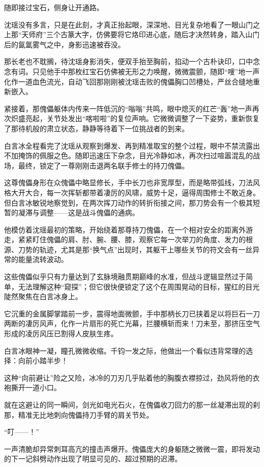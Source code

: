 随即接过宝石，侧身让开通路。

沈瑶没有多言，只是在此刻，才真正抬起眼，深深地、目光复杂地看了一眼山门之上那“天师府”三个古篆大字，仿佛要将它烙印进心底，随后才决然转身，踏入山门后的氤氲雾气之中，身影迅速被吞没。

那长老也不耽搁，待沈瑶身影消失，便双手抬至胸前，掐动一个古朴诀印，口中念念有词。只见他手中那枚红宝石仿佛被无形之力唤醒，微微震颤，随即“嗖”地一声化作一道血色流光，自动飞回那刚刚被沈瑶击败的傀儡胸口凹槽处，严丝合缝地重新嵌入。

紧接着，那傀儡躯体内传来一阵低沉的“嗡嗡”共鸣，眼中熄灭的红芒“轰”地一声再次炽盛亮起，关节处发出“喀啦啦”的复位声响。它微微调整了一下姿势，重新恢复了那待机般的肃立状态，静静等待着下一位挑战者的到来。

\vspace{2em}

白言冰全程看完了沈瑶从观察到爆发、再到精准取宝的整个过程，眼中不禁流露出不加掩饰的佩服之色。随即迅速压下杂念，目光冷静如冰，再次扫过喧嚣混乱的战场，最终，锁定了一尊刚刚击退两名联手修士的持刀傀儡。

这尊傀儡身形在众傀儡中略显修长，手中长刀也非宽厚型，而是略带弧线，刀法风格大开大合，每一次挥斩都带着凄厉的风啸，威势十足，逼得周围修士不敢近身。但白言冰敏锐地察觉到，在两次挥刀动作的转折衔接之间，那刀势会有一个极其短暂的凝滞与调整——这是战斗傀儡的通病。

他模仿着沈瑶最初的策略，开始绕着那尊持刀傀儡，在一个相对安全的距离外游走，紧紧盯住傀儡的肩、肘、腕、腰、膝，观察它每一次举刀的角度、发力的根源、刀势的轨迹，尤其是那“换气点”出现时，其躯干上哪些关节的符文会有一丝异常的能量流转波动。

这些傀儡似乎只有力量达到了玄脉境融贯期巅峰的水准，但战斗逻辑显然过于简单，无法理解这种“窥探”；但它很快便锁定了这个在周围晃动的目标，猩红的目光陡然聚焦在白言冰身上。

它沉重的金属脚掌踏前一步，震得地面微颤，手中那柄长刀已挟着足以将巨石一刀两断的凄厉风声，化作一片扇形的死亡光幕，拦腰横斩而来！刀未至，那挤压空气形成的凌厉风压已割得人皮肤生疼。

白言冰眼神一凝，瞳孔微微收缩。千钧一发之际，他做出一个看似违背常理的选择：向前小踏半步！

这种“向前避让”险之又险，冰冷的刀刃几乎贴着他的胸腹衣襟掠过，劲风将他的衣袍撕开一道小口。

就在这避让的同一瞬间，剑光如电光石火，在傀儡收刀回力的那一丝凝滞出现的刹那，精准无比地刺向傀儡持刀手臂的肩关节处。

“叮——！”

一声清脆却异常刺耳高亢的撞击声爆开。傀儡庞大的身躯随之微微一震，即将发动的下一记斜劈动作出现了明显可见的、超过预期的迟滞。

